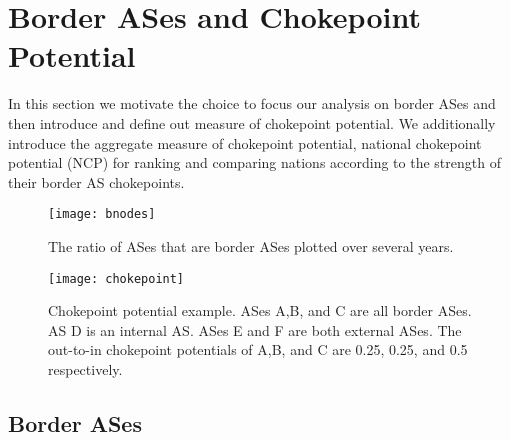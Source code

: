 \section{Border ASes and Chokepoint Potential}

In this section we motivate the choice to focus our analysis on border ASes and then
introduce and define out measure of chokepoint potential. We additionally introduce
the aggregate measure of chokepoint potential, national chokepoint potential (NCP)
for ranking and comparing nations according to the strength of their border AS chokepoints.

\begin{figure}
	\centering
	\texttt{[image: bnodes]}
	\caption{The ratio of ASes that are border ASes plotted over several years.}\label{fig:bnodes}
\end{figure}

\begin{figure}
	\centering
	\texttt{[image: chokepoint]}
	\caption{Chokepoint potential example. ASes A,B, and C are all border ASes. 
						AS D is an internal AS. ASes E and F are both external ASes.
						The out-to-in chokepoint potentials of A,B, and C are 0.25, 0.25, and 0.5 respectively.}\label{fig:chokepoint}
\end{figure}

\subsection{Border ASes}

